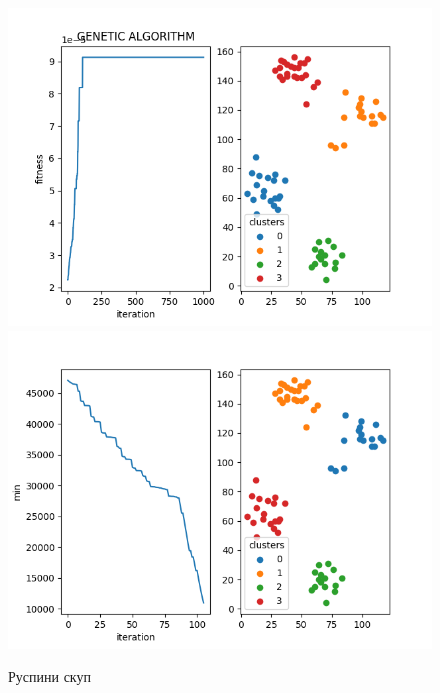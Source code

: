 \documentclass{article}
\begin{document}
\begin{figure}
    \includegraphics[width=\textwidth]{genetic_ruspini.png}
    \includegraphics[width=\textwidth]{greedy_ruspini.png}
    \caption{Руспини скуп}\label{fig:foobar}
\end{figure}
\end{document}
